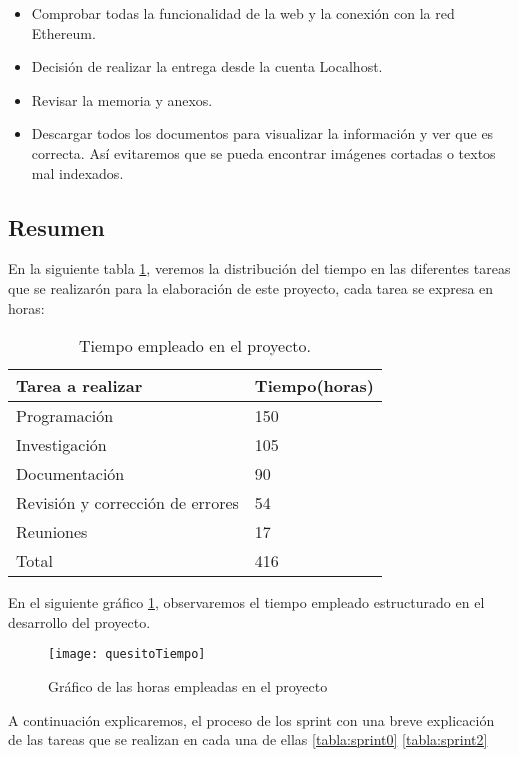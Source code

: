 \begin{itemize}
	\item Comprobar todas la funcionalidad de la web y la conexión con la red Ethereum.
	\item Decisión de realizar la entrega desde la cuenta Localhost.
	\item Revisar la memoria y anexos.
	\item Descargar todos los documentos para visualizar la información y ver que es correcta. Así evitaremos que se pueda encontrar imágenes cortadas o textos mal indexados.
\end{itemize}


\subsection{Resumen}

En la siguiente tabla \ref{tabla:tabla1}, veremos la distribución del tiempo en las diferentes tareas que se realizarón  para la elaboración de este proyecto, cada tarea se expresa en horas:

\begin{table}[H]
	\begin{center}
		\begin{tabular}{|l|l|}
		\hline
			Tarea a realizar & Tiempo(horas)\\ 
			\hline \hline
			Programación & 150 \\ \hline
			Investigación & 105 \\ \hline
			Documentación & 90 \\ \hline
			Revisión y corrección de errores & 54\\ \hline
			Reuniones & 17 \\ \hline
			Total & 416 \\ \hline
		\end{tabular}
	\caption{Tiempo empleado en el proyecto.}
	\label{tabla:tabla1}
	\end{center}
\end{table}

En el siguiente gráfico \ref{ref:horas}, observaremos el tiempo empleado estructurado en el desarrollo del proyecto.

\begin{figure}
    \centering
    \texttt{[image: quesitoTiempo]}
    \caption{Gráfico de las horas empleadas en el proyecto}
    \label{ref:horas}
\end{figure}
 
A continuación explicaremos, el proceso de los sprint con una breve explicación de las tareas que se realizan en cada una de ellas \ref{tabla:sprint0} \ref{tabla:sprint2} 

